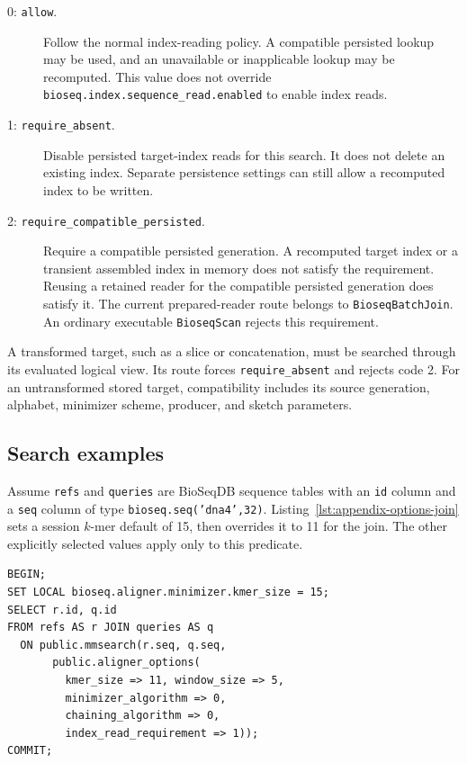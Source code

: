 \begin{description}
  \item[0: \texttt{allow}.] Follow the normal index-reading policy. A
    compatible persisted lookup may be used, and an unavailable or
    inapplicable lookup may be recomputed. This value does not override
    \texttt{bioseq.index.sequence\_read.enabled} to enable index reads.
  \item[1: \texttt{require\_absent}.] Disable persisted target-index reads
    for this search. It does not delete an existing index. Separate
    persistence settings can still allow a recomputed index to be written.
  \item[2: \texttt{require\_compatible\_persisted}.] Require a compatible
    persisted generation. A recomputed target index or a transient assembled
    index in memory does not satisfy the requirement. Reusing a retained
    reader for the compatible persisted generation does satisfy it.
    The current prepared-reader route
    belongs to \texttt{BioseqBatchJoin}. An ordinary executable
    \texttt{BioseqScan} rejects this requirement.
\end{description}

A transformed target, such as a slice or concatenation, must be searched
through its evaluated logical view.
Its route forces \texttt{require\_absent} and rejects code 2. For an
untransformed stored target, compatibility includes its source generation,
alphabet, minimizer scheme, producer, and sketch parameters.

\subsection{Search examples}
\label{sec:appendix-options-examples}

Assume \texttt{refs} and \texttt{queries} are BioSeqDB sequence tables with
an \texttt{id} column and a \texttt{seq} column of type
\texttt{bioseq.seq('dna4',32)}. Listing~\ref{lst:appendix-options-join}
sets a session $k$-mer default of 15, then overrides it to 11 for the join.
The other explicitly selected values apply only to this predicate.

\par\noindent\begin{minipage}{\linewidth}
\begin{lstlisting}[style=bioseq-appendix-sql,
  caption={Override session defaults for a sequence join.},
  label={lst:appendix-options-join}]
BEGIN;
SET LOCAL bioseq.aligner.minimizer.kmer_size = 15;
SELECT r.id, q.id
FROM refs AS r JOIN queries AS q
  ON public.mmsearch(r.seq, q.seq,
       public.aligner_options(
         kmer_size => 11, window_size => 5,
         minimizer_algorithm => 0,
         chaining_algorithm => 0,
         index_read_requirement => 1));
COMMIT;
\end{lstlisting}
\end{minipage}

